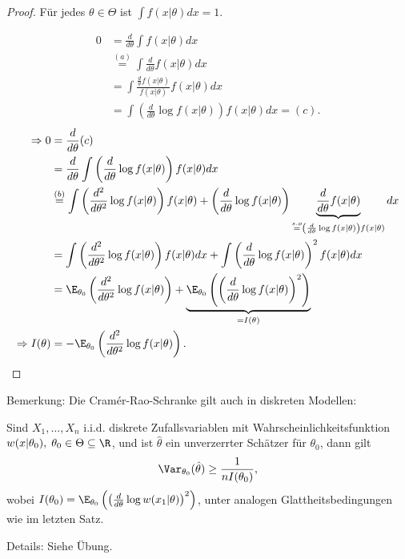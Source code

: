 \documentclass{tstextbook}
\begin{document}
\begin{proof}
	Für jedes $ \theta\in\Theta $ ist $ \int f(x|\theta)dx = 1 $. 
	
	\[
	\begin{aligned}
		0 & = \frac{d}{d\theta}\int f(x|\theta) dx \\
		& \overset{(a)}{=} \int \frac{d}{d\theta} f(x|\theta) dx \\
		& = \int \frac{\frac{d}{\theta}f(x|\theta)}{f(x|\theta)}f(x|\theta) dx \\
		& = \int \left(\frac{d}{d\theta} \log f(x|\theta)\right) f(x|\theta) dx = (c).
	\end{aligned}
	\]
	\[\begin{aligned}
	\Rightarrow 0 & = \frac{d}{d\theta} (c) \\
	& = \frac{d}{d\theta}\int \left(\frac{d}{d\theta} \log f(x|\theta)\right) f(x|\theta) dx \\
	& \overset{(b)}{=} \int \left(\frac{d^2}{d\theta^2} \log f(x|\theta)\right) f(x|\theta) + \left(\frac{d}{d\theta}\log f(x|\theta)\right) \underbrace{\frac{d}{d\theta} f(x|\theta)}_{\overset{s.o}{=}\left(\frac{d}{d\theta}\log f(x|\theta)\right)f(x|\theta)} dx \\
	& = \int \left(\frac{d^2}{d\theta^2} \log f(x|\theta)\right) f(x|\theta) dx + \int \left(\frac{d}{d\theta}\log f(x|\theta)\right)^2 f(x|\theta) dx \\
	& = \E_{\theta_0} \left(\frac{d^2}{d\theta^2}\log f(x|\theta)\right)+\underbrace{\E_{\theta_0}\left(\left(\frac{d}{d\theta}\log f(x|\theta)\right)^2\right)}_{=I(\theta)} \\
	\Rightarrow I(\theta) & = - \E_{\theta_0}\left(\frac{d^2}{d\theta^2}\log f(x|\theta)\right). 
	\end{aligned}
	\]
	
	
\end{proof}


\begin{remark}
	Bemerkung: Die Cramér-Rao-Schranke gilt auch in diskreten Modellen: 
	
	Sind $ X_1,\ldots,X_n $ i.i.d. diskrete Zufallsvariablen mit Wahrscheinlichkeitsfunktion $ w(x|\theta_0), \; \theta_0\in\Theta\subseteq\R $, und ist $ \hat{\theta} $ ein unverzerrter Schätzer für $ \theta_0 $, dann gilt 
	\[
	\Var_{\theta_0}(\hat{\theta}) \ge \frac{1}{nI(\theta_0)},
	\] 
	wobei $ I(\theta_0) = \E_{\theta_0} \left(\left(\frac{d}{d\theta} \log w(x_1|\theta)\right)^2\right) $, unter analogen Glattheitsbedingungen wie im letzten Satz. 
	
	Details: Siehe Übung.
\end{remark}
\end{document}
